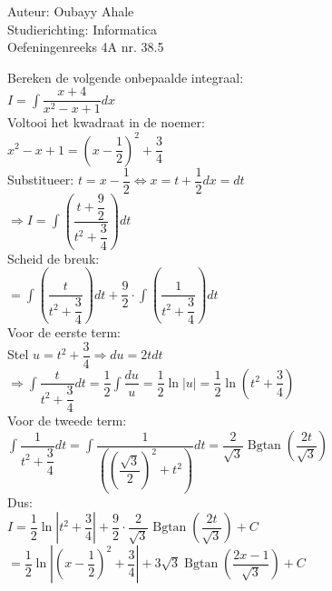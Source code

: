 \documentclass[a4paper]{article}
\newcommand{\dint}{\displaystyle\int}
\newcommand{\Bgtan}{\operatorname{Bgtan}}
\begin{document}
  
\noindent \large Auteur: Oubayy Ahale          \\
\noindent \large Studierichting: Informatica   \\
\noindent \large Oefeningenreeks 4A nr. 38.5   \\

\medskip

\normalsize

Bereken de volgende onbepaalde integraal:\\

$\displaystyle I = \dint \dfrac{x + 4}{x^2 - x + 1} dx$\\

Voltooi het kwadraat in de noemer:\\

$x^2 - x + 1 = \left(x - \dfrac{1}{2}\right)^2 + \dfrac{3}{4}$\\

Substitueer: $t = x - \dfrac{1}{2} \Leftrightarrow x = t + \dfrac{1}{2} dx = dt$\\

$\Rightarrow I = \dint \left( \dfrac{t + \dfrac{9}{2}}{t^2 + \dfrac{3}{4}} \right) dt$\\

Scheid de breuk:\\

$= \dint \left(\dfrac{t}{t^2 + \dfrac{3}{4}} \right) dt + \dfrac{9}{2} \cdot \dint \left( \dfrac{1}{t^2 + \dfrac{3}{4}} \right) dt$\\

Voor de eerste term:\\

Stel $u = t^2 + \dfrac{3}{4} \Rightarrow du = 2t dt$\\

$\Rightarrow \dint \dfrac{t}{t^2 + \dfrac{3}{4}} dt = \dfrac{1}{2} \dint \dfrac{du}{u} = \dfrac{1}{2} \ln|u| = \dfrac{1}{2} \ln\left(t^2 + \dfrac{3}{4}\right)$\\

Voor de tweede term:\\

$\dint \dfrac{1}{t^2 + \dfrac{3}{4}} dt = \dint \dfrac{1}{\left(\left(\dfrac{\sqrt{3}}{2}\right)^2 + t^2\right)} dt = \dfrac{2}{\sqrt{3}} \Bgtan\left(\dfrac{2t}{\sqrt{3}}\right)$\\

Dus:\\

$I = \dfrac{1}{2} \ln\left|t^2 + \dfrac{3}{4}\right| + \dfrac{9}{2} \cdot \dfrac{2}{\sqrt{3}} \Bgtan\left(\dfrac{2t}{\sqrt{3}}\right) + C$\\

$= \dfrac{1}{2} \ln\left|\left(x - \dfrac{1}{2}\right)^2 + \dfrac{3}{4}\right| + 3\sqrt{3} \Bgtan\left(\dfrac{2x - 1}{\sqrt{3}}\right) + C$\\
\end{document}
